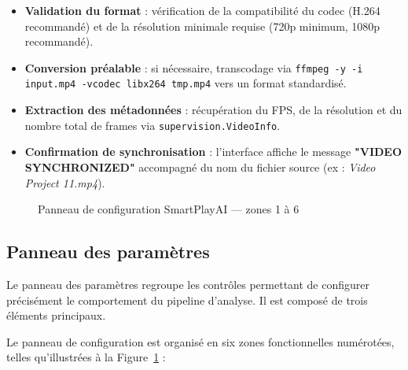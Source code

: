 \begin{itemize}[leftmargin=1.5em]
  \item \textbf{Validation du format} : vérification de la compatibilité du codec (H.264
        recommandé) et de la résolution minimale requise (720p minimum, 1080p recommandé).
  \item \textbf{Conversion préalable} : si nécessaire, transcodage via
        \texttt{ffmpeg -y -i input.mp4 -vcodec libx264 tmp.mp4} vers un format standardisé.
  \item \textbf{Extraction des métadonnées} : récupération du FPS, de la résolution et du
        nombre total de frames via \texttt{supervision.VideoInfo}.
  \item \textbf{Confirmation de synchronisation} : l'interface affiche le message
        \textbf{"VIDEO SYNCHRONIZED"} accompagné du nom du fichier source
        (ex : \textit{Video Project 11.mp4}).
\end{itemize}
 
\begin{figure}[H]
    \centering
    \caption{Panneau de configuration SmartPlayAI — zones 1 à 6}
    \label{fig:panneau_configuration}
\end{figure}
 
\subsection{Panneau des paramètres}
 
Le panneau des paramètres regroupe les contrôles permettant de configurer précisément le
comportement du pipeline d'analyse. Il est composé de trois éléments principaux.
 

Le panneau de configuration est organisé en six zones fonctionnelles numérotées,
telles qu'illustrées à la Figure~\ref{fig:panneau_configuration} :

